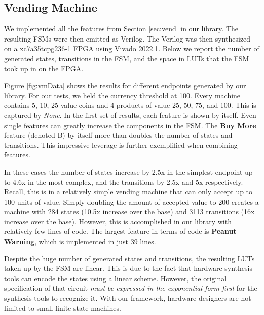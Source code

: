 \documentclass[sigplan,anonymous,review]{acmart}
\begin{document}
\subsection{Vending Machine}\label{sec:vendresults}
We implemented all the features from Section \ref{sec:vend} in our library. The resulting FSMs were then emitted as Verilog. The Verilog was then synthesized on a xc7a35tcpg236-1 FPGA using Vivado 2022.1. Below we report the number of generated states, transitions in the FSM, and the space in LUTs that the FSM took up in on the FPGA.

Figure \ref{fig:vmData} shows the results for different endpoints generated by our library. For our tests, we held the currency threshold at 100. Every machine contains 5, 10, 25 value coins and 4 products of value 25, 50, 75, and 100. This is captured by \textit{None}. In the first set of results, each feature is shown by itself. Even single features can greatly increase the components in the FSM. The \textbf{Buy More} feature (denoted B) by itself more than doubles the number of states and transitions. This impressive leverage is further exemplified when combining features. 

In these cases the number of states increase by 2.5x in the simplest endpoint up to 4.6x in the most complex, and the transitions by 2.5x and 5x respectively. Recall, this is in a relatively simple vending machine that can only accept up to 100 units of value. Simply doubling the amount of accepted value to 200 creates a machine with 284 states (10.5x increase over the base) and 3113 transitions (16x increase over the base). However, this is accomplished in our library with relatively few lines of code. The largest feature in terms of code is \textbf{Peanut Warning}, which is implemented in just 39 lines. 

Despite the huge number of generated states and transitions, the resulting LUTs taken up by the FSM are linear. This is due to the fact that hardware synthesis tools can encode the states using a linear scheme. However, the original specification of that circuit \textit{must be expressed in the exponential form first} for the synthesis tools to recognize it. With our framework, hardware designers are not limited to small finite state machines.
\end{document}
